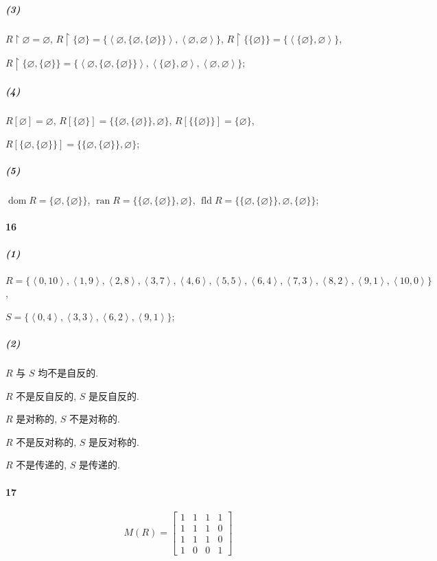 \documentclass{ctexart}
\def\pair#1{\left\langle #1 \right\rangle}
\def\restr{\mathbin{\upharpoonright}}
\DeclareMathOperator{\dom}{dom}
\DeclareMathOperator{\ran}{ran}
\DeclareMathOperator{\fld}{fld}
\begin{document}
\subparagraph*{(3)} $R\restr \varnothing = \varnothing$,
$R\restr \{\varnothing\} = \{\pair{\varnothing, \{\varnothing, \{\varnothing\}\}}, \pair{\varnothing, \varnothing}\}$,
$R\restr \{\{\varnothing\}\} = \{\pair{\{\varnothing\},\varnothing}\}$,

$R\restr \{\varnothing, \{\varnothing\}\} = \{\pair{\varnothing, \{\varnothing, \{\varnothing\}\}}, \pair{\{\varnothing\},\varnothing}, \pair{\varnothing, \varnothing}\}$;

\subparagraph*{(4)} $R[\varnothing] = \varnothing$,
$R[\{\varnothing\}] = \{\{\varnothing, \{\varnothing\}\}, \varnothing\}$,
$R[\{\{\varnothing\}\}] = \{\varnothing\}$,

$R[\{\varnothing, \{\varnothing\}\}] = \{\{\varnothing, \{\varnothing\}\}, \varnothing\}$;

\subparagraph*{(5)} $\dom R = \{\varnothing, \{\varnothing\}\}$,
$\ran R = \{\{\varnothing, \{\varnothing\}\}, \varnothing\}$,
$\fld R = \{\{\varnothing, \{\varnothing\}\}, \varnothing, \{\varnothing\}\}$;

\paragraph*{16}

\subparagraph*{(1)} $R=\{\pair{0,10}, \pair{1,9}, \pair{2,8}, \pair{3,7}, \pair{4,6}, \pair{5,5}, \pair{6,4}, \pair{7,3}, \pair{8,2}, \pair{9,1}, \pair{10,0}\}$,

$S = \{\pair{0,4}, \pair{3,3}, \pair{6,2}, \pair{9,1}\}$;

\subparagraph*{(2)} $R$ 与 $S$ 均不是自反的.

$R$ 不是反自反的, $S$ 是反自反的.

$R$ 是对称的, $S$ 不是对称的.

$R$ 不是反对称的, $S$ 是反对称的.

$R$ 不是传递的, $S$ 是传递的.

\paragraph*{17}
\begin{equation*}
    M(R) = \begin{bmatrix}
        1 & 1 & 1 & 1 \\
        1 & 1 & 1 & 0 \\
        1 & 1 & 1 & 0 \\
        1 & 0 & 0 & 1
    \end{bmatrix}
\end{equation*}
\end{document}
